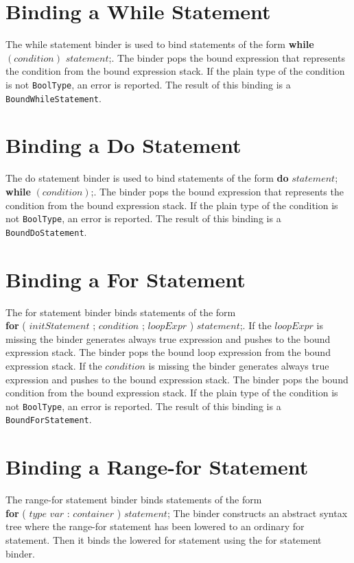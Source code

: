 \documentclass[a4paper,oneside,11pt]{book}
\theoremstyle{definition}
\begin{document}
\section{Binding a While Statement}

The while statement binder is used to bind statements of the form \textbf{while} $(condition)$ $statement$;.
The binder pops the bound expression that represents the condition from the bound expression stack.
If the plain type of the condition is not \verb|BoolType|, an error is reported.
The result of this binding is a \verb|BoundWhileStatement|.

\section{Binding a Do Statement}

The do statement binder is used to bind statements of the form \textbf{do} $statement$; \textbf{while} $(condition)$;.
The binder pops the bound expression that represents the condition from the bound expression stack.
If the plain type of the condition is not \verb|BoolType|, an error is reported.
The result of this binding is a \verb|BoundDoStatement|.

\section{Binding a For Statement}

The for statement binder binds statements of the form\\ \textbf{for} ( $initStatement$ ; $condition$ ; $loopExpr$ ) $statement$;.
If the $loopExpr$ is missing the binder generates always true expression and pushes to the bound expression stack.
The binder pops the bound loop expression from the bound expression stack.
If the $condition$ is missing the binder generates always true expression and pushes to the bound expression stack.
The binder pops the bound condition from the bound expression stack.
If the plain type of the condition is not \verb|BoolType|, an error is reported.
The result of this binding is a \verb|BoundForStatement|.

\section{Binding a Range-for Statement}

The range-for statement binder binds statements of the form\\ \textbf{for} ( $type$ $var$ : $container$ ) $statement$;
The binder constructs an abstract syntax tree where the range-for statement has been lowered to an ordinary for statement.
Then it binds the lowered for statement using the for statement binder.
\end{document}
